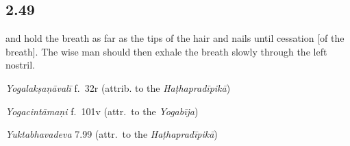 \begin{ekdosis}
\begin{philcomm}[hp02_048]
\end{philcomm}

\subsection*{2.49}
\begin{translation}[hp02_049]
and hold the breath as far as the tips of the hair and nails until cessation [of the breath]. The wise man should then exhale the breath slowly through the left nostril.
\end{translation}


\begin{testimonia}[hp02_049]
\emph{Yogalakṣaṇāvalī} f.~32r (attrib. to the \emph{Haṭhapradīpikā})
\begin{versinnote}
\end{versinnote}

\emph{Yogacintāmaṇi} f.~101v (attr.~to the \emph{Yogabīja})
\begin{versinnote} 
\end{versinnote}

\emph{Yuktabhavadeva} 7.99 (attr.~to the \emph{Haṭhapradīpikā})

\begin{versinnote}
\end{versinnote}
\end{testimonia}


\end{ekdosis}
